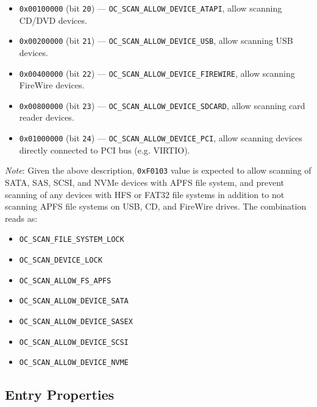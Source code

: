 \documentclass[]{article}
\providecommand{\tightlist}{%
  \setlength{\itemsep}{0pt}\setlength{\parskip}{0pt}}
\begin{document}
\begin{enumerate}
\begin{itemize}
    \item \texttt{0x00100000} (bit \texttt{20}) --- \texttt{OC\_SCAN\_ALLOW\_DEVICE\_ATAPI}, allow
    scanning CD/DVD devices.
    \item \texttt{0x00200000} (bit \texttt{21}) --- \texttt{OC\_SCAN\_ALLOW\_DEVICE\_USB}, allow
    scanning USB devices.
    \item \texttt{0x00400000} (bit \texttt{22}) --- \texttt{OC\_SCAN\_ALLOW\_DEVICE\_FIREWIRE}, allow
    scanning FireWire devices.
    \item \texttt{0x00800000} (bit \texttt{23}) --- \texttt{OC\_SCAN\_ALLOW\_DEVICE\_SDCARD}, allow
    scanning card reader devices.
    \item \texttt{0x01000000} (bit \texttt{24}) --- \texttt{OC\_SCAN\_ALLOW\_DEVICE\_PCI}, allow
    scanning devices directly connected to PCI bus (e.g. VIRTIO).
  \end{itemize}

  \emph{Note}: Given the above description, \texttt{0xF0103} value is expected to allow
  scanning of SATA, SAS, SCSI, and NVMe devices with APFS file system, and prevent scanning
  of any devices with HFS or FAT32 file systems in addition to not scanning APFS file systems
  on USB, CD, and FireWire drives. The combination reads as:
  \begin{itemize}
  \tightlist
  \item \texttt{OC\_SCAN\_FILE\_SYSTEM\_LOCK}
  \item \texttt{OC\_SCAN\_DEVICE\_LOCK}
  \item \texttt{OC\_SCAN\_ALLOW\_FS\_APFS}
  \item \texttt{OC\_SCAN\_ALLOW\_DEVICE\_SATA}
  \item \texttt{OC\_SCAN\_ALLOW\_DEVICE\_SASEX}
  \item \texttt{OC\_SCAN\_ALLOW\_DEVICE\_SCSI}
  \item \texttt{OC\_SCAN\_ALLOW\_DEVICE\_NVME}
  \end{itemize}

\end{enumerate}

\subsection{Entry Properties}\label{miscentryprops}
\end{document}
